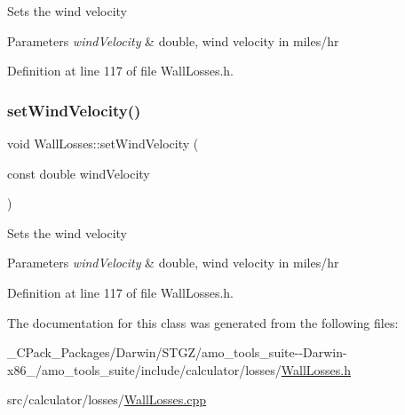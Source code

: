 Sets the wind velocity 
\begin{DoxyParams}{Parameters}
{\em wind\+Velocity} & double, wind velocity in miles/hr \\
\hline
\end{DoxyParams}


Definition at line 117 of file Wall\+Losses.\+h.

\mbox{\label{class_wall_losses_ae376b7ce4e5b3c45a663395802c176a9}} 
\subsubsection{\texorpdfstring{set\+Wind\+Velocity()}{setWindVelocity()}\hspace{0.1cm}{\footnotesize\ttfamily [3/3]}}
{\footnotesize\ttfamily void Wall\+Losses\+::set\+Wind\+Velocity (\begin{DoxyParamCaption}\item[{const double}]{wind\+Velocity }\end{DoxyParamCaption})\hspace{0.3cm}{\ttfamily [inline]}}

Sets the wind velocity 
\begin{DoxyParams}{Parameters}
{\em wind\+Velocity} & double, wind velocity in miles/hr \\
\hline
\end{DoxyParams}


Definition at line 117 of file Wall\+Losses.\+h.



The documentation for this class was generated from the following files\+:\begin{DoxyCompactItemize}
\item 
\+\_\+\+C\+Pack\+\_\+\+Packages/\+Darwin/\+S\+T\+G\+Z/amo\+\_\+tools\+\_\+suite-\/-\/\+Darwin-\/x86\+\_/amo\+\_\+tools\+\_\+suite/include/calculator/losses/\hyperlink{___c_pack___packages_2_darwin_2_s_t_g_z_2amo__tools__suite--_darwin-x86__64_2amo__tools__suite_2f669499b4bf84a855fc1c8b5be40a12c}{Wall\+Losses.\+h}\item 
src/calculator/losses/\hyperlink{_wall_losses_8cpp}{Wall\+Losses.\+cpp}\end{DoxyCompactItemize}
